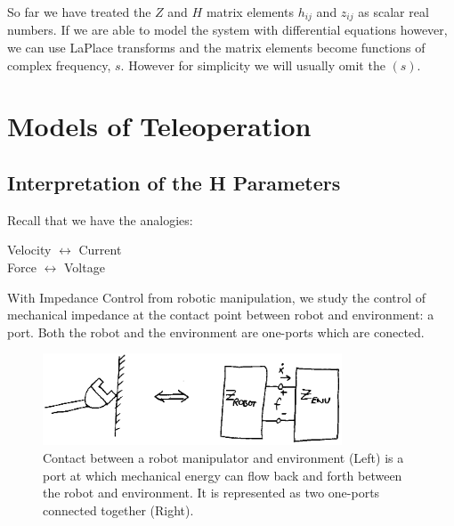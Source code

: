 

So far we have treated the $Z$ and $H$ matrix elements $h_{ij}$ and $z_{ij}$ as scalar real numbers.  If we are able to model the system with differential equations however, we can use LaPlace transforms and the matrix elements become functions of complex frequency, $s$.   However for simplicity we will usually omit the $(s)$.	%










\section{Models of Teleoperation}

\subsection{Interpretation of the H Parameters}

Recall that we have the analogies:

\begin{centering}
Velocity $\leftrightarrow$ Current \\
Force    $\leftrightarrow$ Voltage\\
\end{centering}

With Impedance Control from robotic manipulation, we study the control of mechanical impedance at the contact point between robot and environment: a port.  Both the robot and the environment are one-ports which are conected.	%


\begin{figure}[h]	%
\centering \includegraphics[width=3.5in]{figs14/00319.eps}
\caption{Contact between a robot manipulator and environment (Left) is a port at which mechanical energy can flow back and forth between the robot and environment. It is represented as two one-ports connected together (Right).}\label{RobotEnvContact}	%
\end{figure}	%


